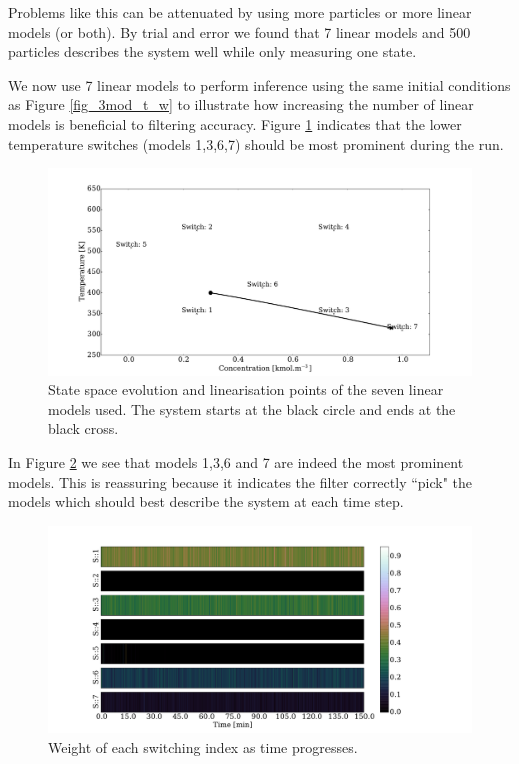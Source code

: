 \documentclass[../masters.tex]{subfiles}
\begin{document}
Problems like this can be attenuated by using more particles or more linear models (or both). By trial and error we found that 7 linear models and 500 particles describes the system well while only measuring one state.

We now use 7 linear models to perform inference using the same initial conditions as Figure \ref{fig_3mod_t_w} to illustrate how increasing the number of linear models is beneficial to filtering accuracy. Figure \ref{fig_7mod_ss_m1} indicates that the lower temperature switches (models 1,3,6,7) should be most prominent during the run.  
\begin{figure}[H] 
\centering
\includegraphics[scale=0.3]{skf_s7_s_m1.pdf}
\caption{State space evolution and linearisation points of the seven linear models used. The system starts at the black circle and ends at the black cross.}
\label{fig_7mod_ss_m1}
\end{figure}
In Figure \ref{fig_7mod_w_m1} we see that models 1,3,6 and 7 are indeed the most prominent models. This is reassuring because it indicates the filter correctly ``pick" the models which should best describe the system at each time step. 
\begin{figure}[H] 
\centering
\includegraphics[scale=0.3]{skf_s7_w_m1.pdf}
\caption{Weight of each switching index as time progresses.}
\label{fig_7mod_w_m1}
\end{figure}
\end{document}
